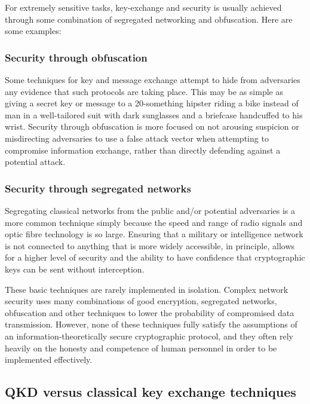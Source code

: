 \documentclass[twocolumn, aps, rmp, amsmath, amssymb, nofootinbib, superscriptaddress, longbibliography, floatfix, table-of-contents, eqsecnum]{revtex4-2}
\begin{document}
For extremely sensitive tasks, key-exchange and security is usually achieved through some combination of segregated networking and obfuscation. Here are some examples: 

\subsubsection{Security through obfuscation}

Some techniques for key and message exchange attempt to hide from adversaries any evidence that such protocols are taking place. This may be as simple as giving a secret key or message to a 20-something hipster riding a bike instead of man in a well-tailored suit with dark sunglasses and a briefcase handcuffed to his wrist. Security through obfuscation is more focused on not arousing suspicion or misdirecting adversaries to use a false attack vector when attempting to compromise information exchange, rather than directly defending against a potential attack. 

\subsubsection{Security through segregated networks}

Segregating classical networks from the public and/or potential adversaries is a more common technique simply because the speed and range of radio signals and optic fibre technology is so large. Ensuring that a military or intelligence network is not connected to anything that is more widely accessible, in principle, allows for a higher level of security and the ability to have confidence that cryptographic keys can be sent without interception. 

These basic techniques are rarely implemented in isolation. Complex network security uses many combinations of good encryption, segregated networks, obfuscation and other techniques to lower the probability of compromised data transmission. However, none of these techniques fully satisfy the assumptions of an information-theoretically secure cryptographic protocol, and they often rely heavily on the honesty and competence of human personnel in order to be implemented effectively. 

\subsection{QKD versus classical key exchange techniques}
\end{document}
